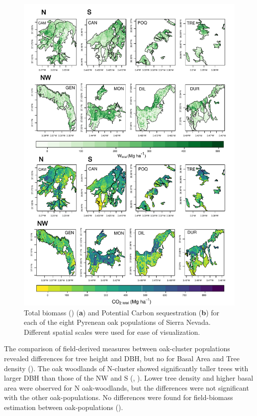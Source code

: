 \begin{figure}
    \centering
    \includegraphics[width=\textwidth]{img/carbon/carbon-mapas-wt-ct.pdf}
    \caption{Total biomass (\wt) (\textbf{a}) and Potential Carbon sequestration (\textbf{b}) for each of the eight Pyrenean oak populations of Sierra Nevada. Different spatial scales were used for ease of visualization.}
    \label{fig:carbon:mapas-wt}
\end{figure}

The comparison of field-derived measures between oak-cluster populations revealed differences for tree height and DBH, but no for Basal Area and Tree density (). The oak woodlands of N-cluster showed significantly taller trees with larger DBH than those of the NW and S (, ). Lower tree density and higher basal area were observed for N oak-woodlands, but the differences were not significant with the other oak-populations. No differences were found for field-biomass estimation between oak-populations ().

